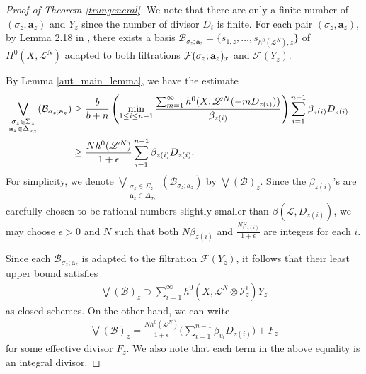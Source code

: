 \documentclass[10pt]{amsart}
\numberwithin{equation}{section}
\theoremstyle{plain}
\theoremstyle{definition}
\begin{document}
\begin{proof}[Proof of Theorem \ref{trungeneral}]
We note that there are only a finite number of $(\sigma_z, \mathbf{a}_z)$ and $Y_z$ since the number of divisor $D_i$ is finite. For each pair $(\sigma_z, \mathbf{a}_z)$, by Lemma 2.18 in \cite{HLX}, there exists a basis 
$ \mathcal{B}_{\sigma_z; \mathbf{a}_z} 
 =\{s_{1,z},\ldots, s_{h^0(\mathscr{L}^N),z}\}$ of $H^0(X, {\mathscr L}^N)$ 
adapted to both filtrations $\mathcal {F}(\sigma_z; {\bf a}_z)_x$ and $\mathcal{F}(Y_z)$.

 By Lemma \ref{aut_main_lemma}, we have the estimate
\begin{align}\label{filtration1}
 \bigvee_{\substack{\sigma_z\in\Sigma_z \\ \mathbf a_z \in \Delta_{\sigma_z}}}( \mathcal B _{\sigma_z;\mathbf{a}_z})
   & \ge \frac b{b+n}\left(\min_{1\le i\le n-1 }
      \frac{\sum_{m=1}^\infty h^0(X,\mathscr L^N(-mD_{z(i)}))}{\beta_{z(i)}}\right)
      \sum_{i=1}^{n-1} \beta_{z(i)}D_{z(i)}\cr
      & \ge  
      \frac{Nh^0(\mathscr L^N)}{1+\epsilon} 
      \sum_{i=1}^{n-1}\beta_{z(i)}D_{z(i)}.
\end{align}
 For simplicity, we denote 
$\bigvee_{\substack{\sigma_z\in\Sigma_z \\ \mathbf a_z \in \Delta_{\sigma_z}}}( \mathcal B _{\sigma_z;\mathbf{a}_z})$ by $\bigvee(\mathcal{B})_z$. Since the $\beta_{z(i)}$'s are carefully chosen to be  rational numbers slightly smaller than $\beta( {\mathscr L}, D_{z(i) })$,
we may choose $\epsilon>0$ and $N$ such that 
both $N\beta_{z(i)}$ and $\frac{N\beta_{z(i)}}{1+\epsilon}$ are integers for each $i$.



Since each $\mathcal{B}_{\sigma_z;\mathbf{a}_z}$ is adapted to the filtration $\mathcal{F}(Y_z)$, it follows that their least upper bound satisfies
\begin{align}\label{multY}
 \bigvee(\mathcal{B})_z  \supset 
        \sum_{i=1}^{\infty} h^0(X, {\mathscr L}^N\otimes {\mathscr I}_z^i )Y_z
        \end{align}
        as closed schemes.
On the other hand, we can write 
\begin{align}\label{sectiondivisor}
 \bigvee(\mathcal{B})_z =
      \frac{Nh^0(\mathscr L^N)}{1+\epsilon} \big( \sum_{i=1}^{n-1}\beta_{v_i}D_{z(i)}\big)+F_z
\end{align}
for some effective divisor $F_z$. We also note that each term in the above equality is an integral divisor.





\end{proof}
\end{document}
